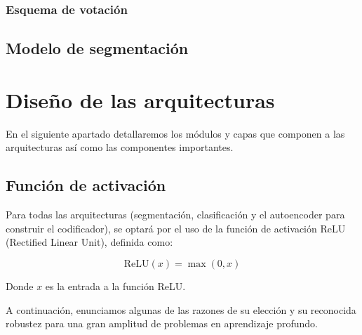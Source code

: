 \subsubsection{Esquema de votación}

\subsection{Modelo de segmentación}

\section{Diseño de las arquitecturas}

En el siguiente apartado detallaremos los módulos y capas que componen a las arquitecturas así como las componentes importantes. 

\subsection{Función de activación}

Para todas las arquitecturas (segmentación, clasificación y el autoencoder para construir el codificador), se optará por el uso de la función de activación ReLU (Rectified Linear Unit), definida como:

$$ \text{ReLU}(x) = \max(0, x) $$

Donde \( x \) es la entrada a la función ReLU.

A continuación, enunciamos algunas de las razones de su elección y su reconocida robustez para una gran amplitud de problemas en aprendizaje profundo.


